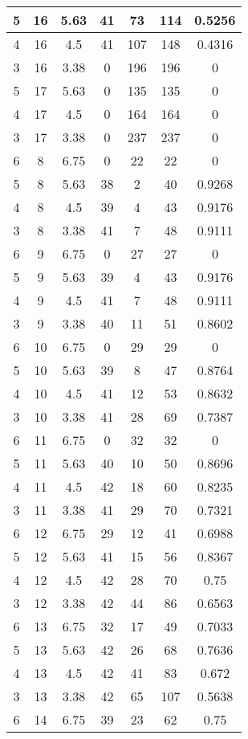 \documentclass[letterpaper, 12pt]{article}
\begin{document}
\begin{longtable}{|c|c|c|c|c|c|c|}
\hline
5 & 16 & 5.63 & 41 & 73 & 114 & 0.5256 \\
\hline
4 & 16 & 4.5 & 41 & 107 & 148 & 0.4316 \\
\hline
3 & 16 & 3.38 & 0 & 196 & 196 & 0 \\
\hline
5 & 17 & 5.63 & 0 & 135 & 135 & 0 \\
\hline
4 & 17 & 4.5 & 0 & 164 & 164 & 0 \\
\hline
3 & 17 & 3.38 & 0 & 237 & 237 & 0 \\
\hline
6 & 8 & 6.75 & 0 & 22 & 22 & 0 \\
\hline
5 & 8 & 5.63 & 38 & 2 & 40 & 0.9268 \\
\hline
4 & 8 & 4.5 & 39 & 4 & 43 & 0.9176 \\
\hline
3 & 8 & 3.38 & 41 & 7 & 48 & 0.9111 \\
\hline
6 & 9 & 6.75 & 0 & 27 & 27 & 0 \\
\hline
5 & 9 & 5.63 & 39 & 4 & 43 & 0.9176 \\
\hline
4 & 9 & 4.5 & 41 & 7 & 48 & 0.9111 \\
\hline
3 & 9 & 3.38 & 40 & 11 & 51 & 0.8602 \\
\hline
6 & 10 & 6.75 & 0 & 29 & 29 & 0 \\
\hline
5 & 10 & 5.63 & 39 & 8 & 47 & 0.8764 \\
\hline
4 & 10 & 4.5 & 41 & 12 & 53 & 0.8632 \\
\hline
3 & 10 & 3.38 & 41 & 28 & 69 & 0.7387 \\
\hline
6 & 11 & 6.75 & 0 & 32 & 32 & 0 \\
\hline
5 & 11 & 5.63 & 40 & 10 & 50 & 0.8696 \\
\hline
4 & 11 & 4.5 & 42 & 18 & 60 & 0.8235 \\
\hline
3 & 11 & 3.38 & 41 & 29 & 70 & 0.7321 \\
\hline
6 & 12 & 6.75 & 29 & 12 & 41 & 0.6988 \\
\hline
5 & 12 & 5.63 & 41 & 15 & 56 & 0.8367 \\
\hline
4 & 12 & 4.5 & 42 & 28 & 70 & 0.75 \\
\hline
3 & 12 & 3.38 & 42 & 44 & 86 & 0.6563 \\
\hline
6 & 13 & 6.75 & 32 & 17 & 49 & 0.7033 \\
\hline
5 & 13 & 5.63 & 42 & 26 & 68 & 0.7636 \\
\hline
4 & 13 & 4.5 & 42 & 41 & 83 & 0.672 \\
\hline
3 & 13 & 3.38 & 42 & 65 & 107 & 0.5638 \\
\hline
6 & 14 & 6.75 & 39 & 23 & 62 & 0.75 \\

\end{longtable}
\end{document}
